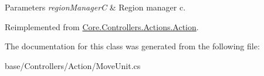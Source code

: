 \begin{DoxyParams}{Parameters}
{\em region\-Manager\-C} & Region manager c.\\
\hline
\end{DoxyParams}


Reimplemented from \hyperlink{classCore_1_1Controllers_1_1Actions_1_1Action_a405b995343a9394ad19e05a699a4e6d9}{Core.\-Controllers.\-Actions.\-Action}.



The documentation for this class was generated from the following file\-:\begin{DoxyCompactItemize}
\item 
base/\-Controllers/\-Action/Move\-Unit.\-cs\end{DoxyCompactItemize}
